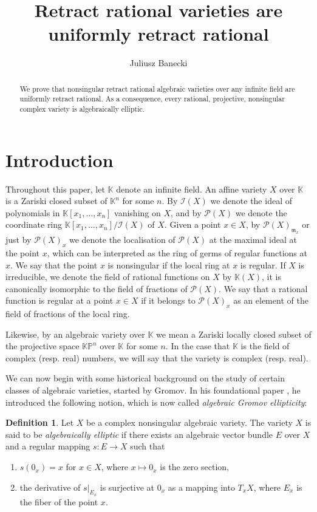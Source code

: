 \documentclass{amsart}
\title{Retract rational varieties are uniformly retract rational}
\author{Juliusz Banecki}
\date{}
\theoremstyle{plain}
\theoremstyle{definition}
\newtheorem{defi}[thm]{Definition}
\theoremstyle{remark}
\numberwithin{equation}{section}
\newcommand{\K}{\mathbb{K}}
\newcommand{\PP}{\mathcal{P}}
\newcommand{\I}{\mathcal{I}}
\begin{document}
\begin{abstract}
We prove that nonsingular retract rational algebraic varieties over any infinite field are uniformly retract rational. As a consequence, every rational, projective, nonsingular complex variety is algebraically elliptic.
\end{abstract}
\maketitle

\section{Introduction}
Throughout this paper, let $\K$ denote an infinite field. An affine variety $X$ over $\K$ is a Zariski closed subset of $\K^n$ for some $n$. By $\I(X)$ we denote the ideal of polynomials in $\K[x_1,\dots,x_n]$ vanishing on $X$, and by $\mathcal{P}(X)$ we denote the coordinate ring $\K[x_1,\dots,x_n]/\I(X)$ of $X$. Given a point $x\in X$, by $\mathcal{P}(X)_{\mathfrak{m}_{x}}$ or just by $\PP(X)_{x}$ we denote the localisation of $\mathcal{P}(X)$ at the maximal ideal at the point $x$, which can be interpreted as the ring of germs of regular functions at $x$. We say that the point $x$ is nonsingular if the local ring at $x$ is regular. If $X$ is irreducible, we denote the field of rational functions on $X$ by $\K(X)$, it is canonically isomorphic to the field of fractions of $\mathcal{P}(X)$. We say that a rational function is regular at a point $x\in X$ if it belongs to $\mathcal{P}(X)_{x}$ as an element of the field of fractions of the local ring.

Likewise, by an algebraic variety over $\K$ we mean a Zariski locally closed subset of the projective space $\K\mathbb{P}^n$ over $\K$ for some $n$. In the case that $\K$ is the field of complex (resp. real) numbers, we will say that the variety is complex (resp. real).

We can now begin with some historical background on the study of certain classes of algebraic varieties, started by Gromov. In his foundational paper \cite{Gromov}, he introduced the following notion, which is now called \emph{algebraic Gromov ellipticity}:
\begin{defi}
Let $X$ be a complex nonsingular algebraic variety. The variety $X$ is said to be \emph{algebraically elliptic} if there exists an algebraic vector bundle $E$ over $X$ and a regular mapping $s:E\rightarrow X$ such that
\begin{enumerate}
    \item $s(0_x)=x$ for $x\in X$, where $x\mapsto 0_x$ is the zero section,
    \item the derivative of $s\vert_{E_x}$ is surjective at $0_x$ as a mapping into $T_x X$, where $E_x$ is the fiber of the point $x$.
\end{enumerate}
\end{defi}
\end{document}
